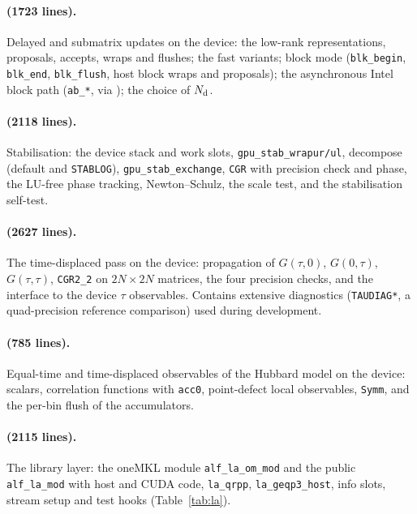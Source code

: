\paragraph{ (1723 lines).} Delayed and submatrix updates on the device: the low-rank representations, proposals, accepts, wraps and flushes; the fast variants; block mode (\texttt{blk\_begin}, \texttt{blk\_end}, \texttt{blk\_flush}, host block wraps and proposals); the asynchronous Intel block path (\texttt{ab\_*}, via ); the choice of $N_{\rm d}$.

\paragraph{ (2118 lines).} Stabilisation: the device stack and work slots, \texttt{gpu\_stab\_wrapur/ul}, decompose (default and \texttt{STABLOG}), \texttt{gpu\_stab\_exchange}, \texttt{CGR} with precision check and phase, the LU-free phase tracking, Newton--Schulz, the scale test, and the stabilisation self-test.

\paragraph{ (2627 lines).} The time-displaced pass on the device: propagation of $G(\tau,0)$, $G(0,\tau)$, $G(\tau,\tau)$, \texttt{CGR2\_2} on $2N\times2N$ matrices, the four precision checks, and the interface to the device $\tau$ observables. Contains extensive diagnostics (\texttt{TAUDIAG*}, a quad-precision reference comparison) used during development.

\paragraph{ (785 lines).} Equal-time and time-displaced observables of the Hubbard model on the device: scalars, correlation functions with \texttt{acc0}, point-defect local observables, \texttt{Symm}, and the per-bin flush of the accumulators.

\paragraph{ (2115 lines).} The library layer: the oneMKL module \texttt{alf\_la\_om\_mod} and the public \texttt{alf\_la\_mod} with host and CUDA code, \texttt{la\_qrpp}, \texttt{la\_geqp3\_host}, info slots, stream setup and test hooks (Table~\ref{tab:la}).

